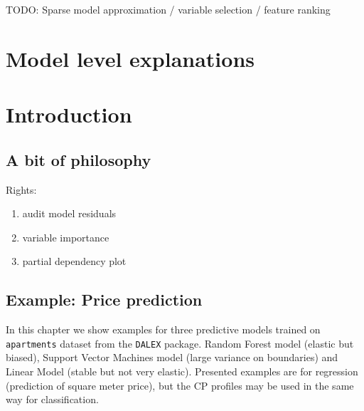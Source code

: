 \documentclass[]{krantz}
\providecommand{\tightlist}{%
  \setlength{\itemsep}{0pt}\setlength{\parskip}{0pt}}
\theoremstyle{definition}
\theoremstyle{definition}
\theoremstyle{definition}
\theoremstyle{remark}
\begin{document}
TODO: Sparse model approximation / variable selection / feature ranking

\hypertarget{model-level-explanations}{%
\section*{Model level explanations}\label{model-level-explanations}}

\hypertarget{introduction-2}{%
\section{Introduction}\label{introduction-2}}

\hypertarget{a-bit-of-philosophy}{%
\subsection{A bit of philosophy}\label{a-bit-of-philosophy}}

Rights:

\begin{enumerate}
\def\labelenumi{\arabic{enumi}.}
\tightlist
\item
  audit model residuals
\item
  variable importance
\item
  partial dependency plot
\end{enumerate}

\hypertarget{example-price-prediction}{%
\subsection{Example: Price prediction}\label{example-price-prediction}}

\citep{R-e1071} \citep{R-factorMerger}

In this chapter we show examples for three predictive models trained on
\texttt{apartments} dataset from the \texttt{DALEX} package. Random
Forest model (elastic but biased), Support Vector Machines model (large
variance on boundaries) and Linear Model (stable but not very elastic).
Presented examples are for regression (prediction of square meter
price), but the CP profiles may be used in the same way for
classification.
\end{document}
